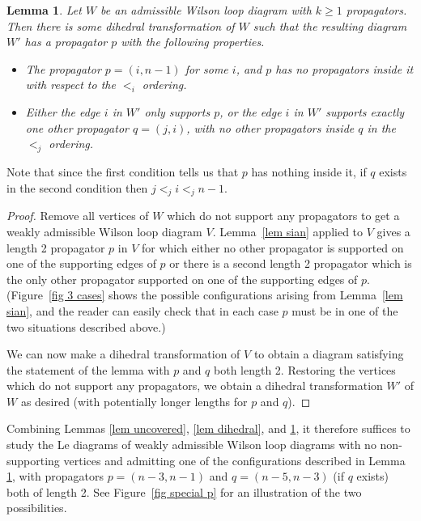 \documentclass[11pt]{article}
\newtheorem{lem}[thm]{Lemma}
\theoremstyle{remark}
\theoremstyle{definition}
\begin{document}
\vspace{0.5em}


\begin{lem}\label{lem good p}
  Let $W$ be an admissible Wilson loop diagram with $k \geq 1$ propagators.  Then there is some dihedral transformation of $W$ such that the resulting diagram $W'$ has a propagator $p$ with the following properties.
  \begin{itemize}
  \item The propagator $p = (i, n-1)$ for some $i$, and $p$ has no propagators inside it with respect to the $<_i$ ordering.
  \item Either the edge $i$ in $W'$ only supports $p$, or the edge $i$ in $W'$ supports exactly one other propagator $q = (j,i)$, with no other propagators inside $q$ in the $<_j$ ordering. 
  \end{itemize}
\end{lem}
Note that since the first condition tells us that $p$ has nothing inside it, if $q$ exists in the second condition then $j<_ji<_jn-1$. 

\begin{proof}
  Remove all vertices of $W$ which do not support any propagators to get a weakly admissible Wilson loop diagram $V$.  Lemma~\ref{lem sian} applied to $V$ gives a length 2 propagator $p$ in $V$ for which either no other propagator is supported on one of the supporting edges of $p$ or there is a second length 2 propagator which is the only other propagator supported on one of the supporting edges of $p$.  (Figure~\ref{fig 3 cases} shows the possible configurations arising from Lemma~\ref{lem sian}, and the reader can easily check that in each case $p$ must be in one of the two situations described above.)

  We can now make a dihedral transformation of $V$ to obtain a diagram satisfying the statement of the lemma with $p$ and $q$ both length 2. Restoring the vertices which do not support any propagators, we obtain a dihedral transformation $W'$ of $W$ as desired (with potentially longer lengths for $p$ and $q$).
\end{proof}



Combining Lemmas \ref{lem uncovered}, \ref{lem dihedral}, and \ref{lem good p}, it therefore suffices to study the Le diagrams of weakly admissible Wilson loop diagrams with no non-supporting vertices and admitting one of the configurations described in Lemma \ref{lem good p}, with propagators $p = (n-3, n-1)$ and $q= (n-5, n-3)$ (if $q$ exists) both of length 2. See Figure~\ref{fig special p} for an illustration of the two possibilities. 
\end{document}

